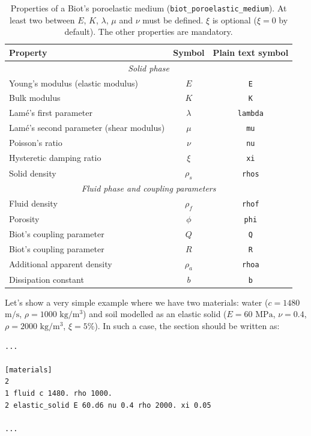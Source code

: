 \documentclass[a4paper,fleqn]{book}
\begin{document}
\begin{table}[h]
\centering
{\small
\begin{tabular}{lcc}
\textbf{Property} & \textbf{Symbol} & \textbf{Plain text symbol} \\
\midrule
\multicolumn{3}{c}{\textit{Solid phase}} \\
\midrule
Young's modulus (elastic modulus)         & $E$       & \texttt{E}      \\
Bulk modulus                              & $K$       & \texttt{K}      \\
Lam\'e's first parameter                  & $\lambda$ & \texttt{lambda} \\
Lam\'e's second parameter (shear modulus) & $\mu$     & \texttt{mu}     \\
Poisson's ratio                           & $\nu$     & \texttt{nu}     \\
Hysteretic damping ratio                  & $\xi$     & \texttt{xi}     \\
Solid density                             & $\rho_s$  & \texttt{rhos}   \\
\midrule
\multicolumn{3}{c}{\textit{Fluid phase and coupling parameters}} \\
\midrule
Fluid density               & $\rho_f$ & \texttt{rhof} \\
Porosity                    & $\phi$   & \texttt{phi}  \\
Biot's coupling parameter   & $Q$      & \texttt{Q}    \\
Biot's coupling parameter   & $R$      & \texttt{R}    \\
Additional apparent density & $\rho_a$ & \texttt{rhoa} \\
Dissipation constant        & $b$      & \texttt{b}    \\
\end{tabular}
}
\caption{Properties of a Biot's poroelastic medium (\texttt{biot\_poroelastic\_medium}). At least two between $E$, $K$, $\lambda$, $\mu$ and $\nu$ must be defined. $\xi$ is optional ($\xi=0$ by default). The other properties are mandatory.}
\label{tab:poroelastic}
\end{table}

Let's show a very simple example where we have two materials: water ($c=1480$ $\textrm{m/s}$, $\rho=1000$ $\mathrm{kg/m^3}$) and soil modelled as an elastic solid ($E=60$ $\mathrm{MPa}$, $\nu=0.4$, $\rho=2000$ $\mathrm{kg/m^3}$, $\xi=5\%$). In such a case, the section should be written as:
\begin{Verbatim}[frame=single, fontsize=\small, label=input.dat]
...

[materials]
2
1 fluid c 1480. rho 1000.
2 elastic_solid E 60.d6 nu 0.4 rho 2000. xi 0.05

...
\end{Verbatim}
\end{document}
